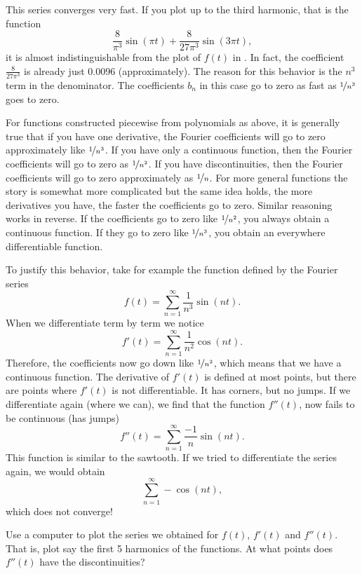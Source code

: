 \documentclass{ximera}
\begin{document}
\begin{example}
    This series converges very fast. If you plot up to the third harmonic, that is the function
    \begin{equation*}
        \frac{8}{\pi^3} \sin (\pi t) + \frac{8}{27 \pi^3} \sin (3 \pi t) ,
    \end{equation*}
    it is almost indistinguishable from the plot of $f(t)$ in . In fact, the coefficient  $\frac{8}{27 \pi^3}$ is already just 0.0096 (approximately). The reason for this behavior is the $n^3$ term in the denominator. The coefficients $b_n$ in this case go to zero as fast as $\nicefrac{1}{n^3}$ goes to zero.
\end{example}

For functions constructed piecewise from polynomials as above, it is generally true that if you have one derivative, the Fourier coefficients will go to zero approximately like $\nicefrac{1}{n^3}$.  If you have only a continuous function, then the Fourier coefficients will go to zero as $\nicefrac{1}{n^2}$.  If you have discontinuities, then the Fourier coefficients will go to zero approximately as $\nicefrac{1}{n}$. For more general functions the story is somewhat more complicated but the same idea holds, the more derivatives you have, the faster the coefficients go to zero.  Similar reasoning works in reverse.  If the coefficients go to zero like $\nicefrac{1}{n^2}$, you always obtain a continuous function.  If they go to zero like $\nicefrac{1}{n^3}$, you obtain an everywhere differentiable function.

To justify this behavior, take for example the function defined by the Fourier series
\begin{equation*}
    f(t) = \sum_{n=1}^\infty \frac{1}{n^3} \sin (n t) .
\end{equation*}
When we differentiate term by term we notice
\begin{equation*}
    f'(t) = \sum_{n=1}^\infty \frac{1}{n^2} \cos (n t) .
\end{equation*}
Therefore, the coefficients now go down like $\nicefrac{1}{n^2}$, which  means that we have a continuous function. The derivative of $f'(t)$ is defined at most points, but there are points where $f'(t)$ is not differentiable. It has corners, but no jumps. If we differentiate again (where we can), we find that the function $f''(t)$, now fails to be continuous (has jumps)
\begin{equation*}
    f''(t) = \sum_{n=1}^\infty \frac{-1}{n} \sin (n t) .
\end{equation*}
This function is similar to the sawtooth.  If we tried to differentiate the series again, we would obtain
\begin{equation*}
    \sum_{n=1}^\infty -\cos (n t) ,
\end{equation*}
which does not converge!

\begin{exercise}
    Use a computer to plot the series we obtained for $f(t)$, $f'(t)$ and $f''(t)$.  That is, plot say the first 5 harmonics of the functions.  At what points does $f''(t)$ have the discontinuities?
\end{exercise}
\end{document}
